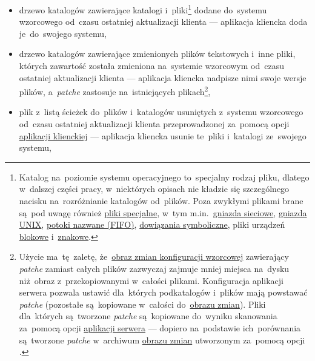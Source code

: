 \documentclass[thesis]{subfiles}
\begin{document}
\begin{itemize}
	\item drzewo katalogów  zawierające katalogi i~pliki\footnote{Katalog na~poziomie  systemu operacyjnego to~specjalny rodzaj pliku, dlatego w~dalszej części pracy, w~niektórych opisach nie kładzie się szczególnego nacisku na~rozróżnianie katalogów od~plików. Poza zwykłymi plikami brane są~pod uwagę również \href{https://en.wikipedia.org/wiki/Unix_file_types}{pliki specjalne}, w~tym m.in.~\href{https://en.wikipedia.org/wiki/Network_socket}{gniazda sieciowe}, \href{https://en.wikipedia.org/wiki/Unix_domain_socket}{gniazda UNIX}, \href{https://en.wikipedia.org/wiki/Named_pipe}{potoki nazwane (FIFO)}, \href{https://en.wikipedia.org/wiki/Symbolic_link}{dowiązania symboliczne}, pliki urządzeń \href{https://en.wikipedia.org/wiki/Device_file\#Block_devices}{blokowe} i~\href{https://en.wikipedia.org/wiki/Device_file\#Character_devices}{znakowe}.} dodane do~systemu wzorcowego od~czasu ostatniej aktualizacji klienta --- aplikacja kliencka doda je~do~swojego systemu,
	\item drzewo katalogów  zawierające  zmienionych plików tekstowych i~inne pliki, których zawartość została zmieniona na~systemie wzorcowym od~czasu ostatniej aktualizacji klienta --- aplikacja kliencka nadpisze nimi swoje wersje plików, a~\emph{patche} zastosuje na~istniejących plikach\footnote{Użycie  ma~tę~zaletę, że~\hyperref[sec:obraz-zmian-konfiguracji]{obraz zmian konfiguracji wzorcowej} zawierający \emph{patche} zamiast całych plików zazwyczaj zajmuje mniej miejsca na~dysku niż~obraz z~przekopiowanymi w~całości plikami. Konfiguracja aplikacji serwera pozwala ustawić dla~których podkatalogów i~plików mają powstawać \emph{patche} (pozostałe są~kopiowane w~całości do~\hyperref[sec:obraz-zmian-konfiguracji]{obrazu zmian}). Pliki dla~których są~tworzone \emph{patche} są~kopiowane do~wyniku skanowania za~pomocą opcji  \hyperref[sec:srv-app]{aplikacji serwera} --- dopiero na~podstawie ich~porównania są~tworzone \emph{patche} w~archiwum \hyperref[sec:obraz-zmian-konfiguracji]{obrazu zmian} utworzonym za~pomocą opcji .},
	\item plik  z~listą ścieżek do~plików i~katalogów usuniętych z~systemu wzorcowego od~czasu ostatniej aktualizacji klienta przeprowadzonej za~pomocą opcji  \hyperref[sec:cli-app]{aplikacji klienckiej} --- aplikacja kliencka usunie te~pliki i~katalogi ze~swojego systemu,

\end{itemize}
\end{document}

